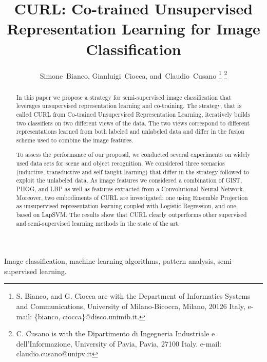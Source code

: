 \documentclass[journal,11pt]{IEEEtran}
\newcommand{\ADD}[1]{#1}
\newcommand{\coso}{strategy}
\newcommand{\emb}{embodiment}
\begin{document}
\title{CURL: Co-trained Unsupervised Representation Learning for Image Classification}

\author{Simone~Bianco,
        Gianluigi~Ciocca,
        and~Claudio~Cusano%
\thanks{S. Bianco, and G. Ciocca are with the Department
of Informatics Systems and Communications, University of Milano-Bicocca, Milano,
20126 Italy, e-mail: \{bianco, ciocca\}@disco.unimib.it.}
\thanks{C. Cusano is with the Dipartimento di Ingegneria Industriale e dell'Informazione, University of Pavia, Pavia, 27100 Italy. e-mail: claudio.cusano@unipv.it}
}



\maketitle

\begin{abstract}
In this paper we propose a \coso{ }for semi-supervised image classification that leverages unsupervised representation learning and co-training. The \coso, that is called CURL from Co-trained Unsupervised Representation Learning, iteratively builds two classifiers on two different views of the data.
The two views correspond to different representations learned from both labeled and unlabeled data and differ in the fusion scheme used to combine the image features.

To assess the performance of our proposal, we conducted several experiments on widely used data sets for scene and object recognition.  We considered three scenarios (inductive, transductive  and self-taught learning) that differ in the strategy followed to exploit the unlabeled data. \ADD{As image features we considered a combination of GIST, PHOG, and LBP as well as features extracted from a Convolutional Neural Network. Moreover, two \emb{s} of CURL are investigated: one using Ensemble Projection as unsupervised representation learning coupled with Logistic Regression, and one based on LapSVM.} The results show that CURL clearly outperforms other supervised and semi-supervised learning methods in the state of the art.

\end{abstract}

\begin{IEEEkeywords}
Image classification, machine learning algorithms, pattern analysis, semi-supervised learning.
\end{IEEEkeywords}
\end{document}
